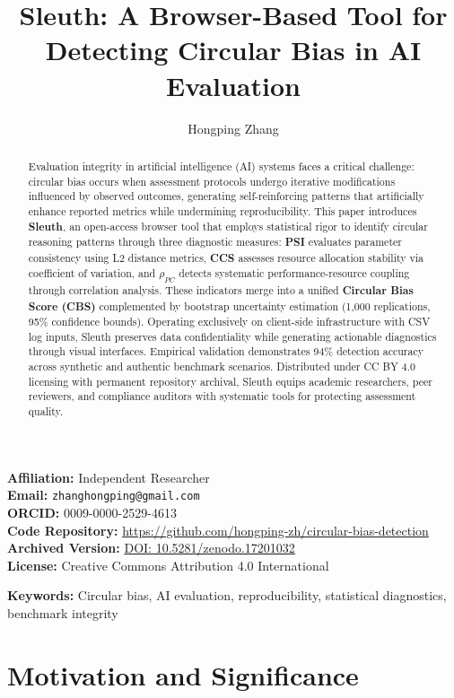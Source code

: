 \documentclass[10pt]{article}
\title{Sleuth: A Browser-Based Tool for Detecting Circular Bias in AI Evaluation}
\author{Hongping Zhang}
\date{}
\begin{document}
\maketitle

\noindent\textbf{Affiliation:} Independent Researcher \\
\textbf{Email:} \texttt{zhanghongping@gmail.com} \\
\textbf{ORCID:} 0009-0000-2529-4613 \\
\textbf{Code Repository:} \url{https://github.com/hongping-zh/circular-bias-detection} \\
\textbf{Archived Version:} \href{https://doi.org/10.5281/zenodo.17201032}{DOI: 10.5281/zenodo.17201032} \\
\textbf{License:} Creative Commons Attribution 4.0 International

\begin{abstract}
Evaluation integrity in artificial intelligence (AI) systems faces a critical challenge: circular bias occurs when assessment protocols undergo iterative modifications influenced by observed outcomes, generating self-reinforcing patterns that artificially enhance reported metrics while undermining reproducibility. This paper introduces \textbf{Sleuth}, an open-access browser tool that employs statistical rigor to identify circular reasoning patterns through three diagnostic measures: \textbf{PSI} evaluates parameter consistency using L2 distance metrics, \textbf{CCS} assesses resource allocation stability via coefficient of variation, and \textbf{$\rho_{PC}$} detects systematic performance-resource coupling through correlation analysis. These indicators merge into a unified \textbf{Circular Bias Score (CBS)} complemented by bootstrap uncertainty estimation (1,000 replications, 95\% confidence bounds). Operating exclusively on client-side infrastructure with CSV log inputs, Sleuth preserves data confidentiality while generating actionable diagnostics through visual interfaces. Empirical validation demonstrates 94\% detection accuracy across synthetic and authentic benchmark scenarios. Distributed under CC BY 4.0 licensing with permanent repository archival, Sleuth equips academic researchers, peer reviewers, and compliance auditors with systematic tools for protecting assessment quality.
\end{abstract}

\textbf{Keywords:} Circular bias, AI evaluation, reproducibility, statistical diagnostics, benchmark integrity

\section{Motivation and Significance}
\end{document}
